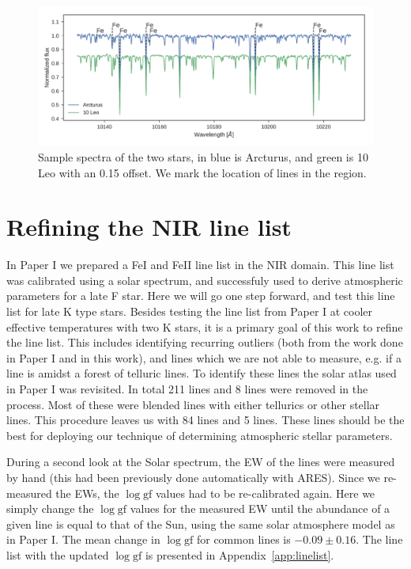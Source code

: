 \documentclass{aa}
\begin{document}
\begin{figure}[htpb!]
    \centering
    \includegraphics[width=1.0\linewidth]{figures/bothspectra.pdf}
    \caption{Sample spectra of the two stars, in blue is Arcturus, and green is
             10 Leo with an 0.15 offset. We mark the location of 
             lines in the region.}
    \label{fig:both}
\end{figure}





\section{Refining the NIR line list}
\label{sec:refining_the_line_list}

In Paper I we prepared a FeI and FeII line list in the NIR domain. This line
list was calibrated using a solar spectrum, and successfuly used to derive
atmospheric parameters for a late F star. Here we will go one step forward, and
test this line list for late K type stars. Besides testing the line list from
Paper I at cooler effective temperatures with two K stars, it is a primary goal
of this work to refine the line list. This includes identifying recurring
outliers (both from the work done in Paper I and in this work), and lines which
we are not able to measure, e.g. if a line is amidst a forest of telluric lines.
To identify these lines the solar atlas used in Paper I was revisited. In total
211  lines and 8  lines were removed in the process. Most
of these were blended lines with either tellurics or other stellar lines. This
procedure leaves us with 84  lines and 5  lines. These
lines should be the best for deploying our technique of determining atmospheric
stellar parameters.

During a second look at the Solar spectrum, the EW of the lines were measured by
hand (this had been previously done automatically with ARES). Since we
re-measured the EWs, the $\log \mathrm{gf}$ values had to be re-calibrated
again. Here we simply change the $\log \mathrm{gf}$ values for the measured EW
until the abundance of a given line is equal to that of the Sun, using the same
solar atmosphere model as in Paper I. The mean change in $\log \mathrm{gf}$ for
common lines is $-0.09 \pm 0.16$. The line list with the updated $\log
\mathrm{gf}$ is presented in Appendix~\ref{app:linelist}.
\end{document}
